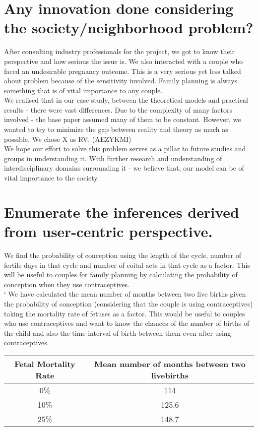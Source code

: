 \documentclass{article}
\begin{document}
\section{Any innovation done considering the society/neighborhood problem?}
After consulting industry professionals for the project, we got to know their perspective and how serious the issue is. We also interacted with a couple who faced an undesirable pregnancy outcome. This is a very serious yet less talked about problem because of the sensitivity involved. Family planning is always something that is of vital importance to any couple.\\
We realised that in our case study, between the theoretical models and practical results - there were vast differences. Due to the complexity of many factors involved - the base paper assumed many of them to be constant. However, we wanted to try to minimize the gap between reality and theory as much as possible. We chose X as RV, (AEZYKMI)\\
We hope our effort to solve this problem serves as a pillar to future studies and groups in understanding it. With further research and understanding of interdisciplinary domains surrounding it - we believe that, our model can be of vital importance to the society.  


\section{Enumerate the inferences derived from user-centric perspective.}
We find the probability of conception using the length of the cycle, number of fertile days in that cycle and number of coital acts in that cycle as a factor. This will be useful to couples for family planning by calculating the probability of conception when they use contraceptives.\\
`
We have calculated the mean number of months between two live births given the probability of conception (considering that the couple is using contraceptives) taking the mortality rate of fetuses as a factor. This would be useful to couples who use contraceptives and want to know the chances of the number of births of the child and also the time interval of birth between them even after using contraceptives.\\
	\begin{table}[h]
		\begin{center}
			\begin{tabular}{|c|c|}
				\hline
				Fetal Mortality Rate  & Mean number of months between two livebirths\\ \hline
				0\% & 114     \\ \hline
				10\% & 125.6 \\ \hline
				25\% & 148.7 \\ \hline
			\end{tabular}
		\end{center}
	\end{table}
\end{document}
